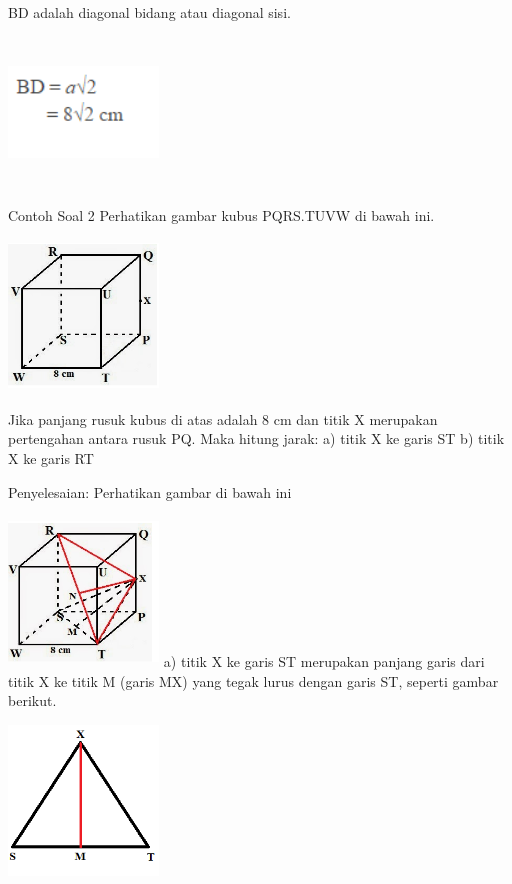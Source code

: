 \documentclass[11pt,fleqn]{book} %
\begin{document}
BD adalah diagonal bidang atau diagonal sisi.


\includegraphics[width = 4cm, height= 4cm]{Pictures/gi9.png}


Contoh Soal 2
Perhatikan gambar kubus PQRS.TUVW di bawah ini.

\includegraphics[width = 4cm, height= 4cm]{Pictures/gi10.png}

Jika panjang rusuk kubus di atas adalah 8 cm dan titik X merupakan pertengahan antara rusuk PQ. Maka hitung jarak:
a) titik X ke garis ST
b) titik X ke garis RT

Penyelesaian:
Perhatikan gambar di bawah ini

\includegraphics[width = 4cm, height= 4cm]{Pictures/gi11.png}
a) titik X ke garis ST merupakan panjang garis dari titik X ke titik M (garis MX) yang tegak lurus dengan garis ST, seperti gambar berikut.

\includegraphics[width = 4cm, height= 4cm]{Pictures/gi12.png}
\end{document}
